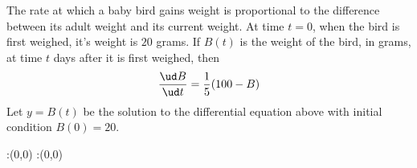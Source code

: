 \question The rate at which a baby bird gains weight is proportional to the difference 
between its adult weight and its current weight. At time $t=0$, when the bird is first
weighed, it's weight is $20$ grams. If $B(t)$ is the weight of the bird, in grams, at
time $t$ days after it is first weighed, then
\begin{align}
  \dfrac{\ud B}{\ud t} = \dfrac{1}{5}(100 - B) \nonumber
\end{align}
Let $y=B(t)$ be the solution to the differential equation above with initial condition
$B(0)=20$. 


\ifprintanswers
  \begin{marginfigure}
      :(0,0)
      :(0,0)
    \figdrawbegin{}
      \figdrawline [100,101]
    \figdrawend
    \figvisu{\figBoxA}{}{%
    }
    \centerline{\box\figBoxA}
  \end{marginfigure}
\fi 

